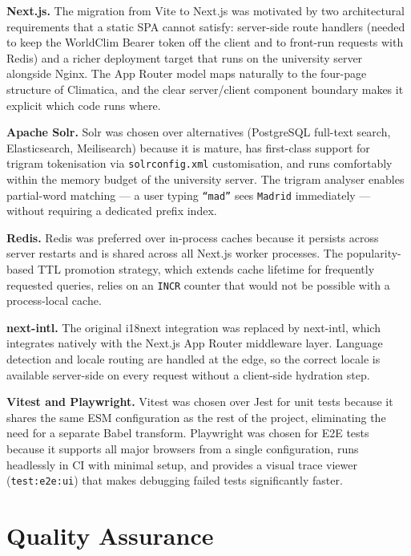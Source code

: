 \textbf{Next.js.} The migration from Vite to Next.js was motivated by two
architectural requirements that a static SPA cannot satisfy: server-side route
handlers (needed to keep the WorldClim Bearer token off the client and to
front-run requests with Redis) and a richer deployment target that runs on the
university server alongside Nginx. The App Router model maps naturally to the
four-page structure of Climatica, and the clear server/client component boundary
makes it explicit which code runs where.

\textbf{Apache Solr.} Solr was chosen over alternatives (PostgreSQL full-text
search, Elasticsearch, Meilisearch) because it is mature, has first-class
support for trigram tokenisation via \texttt{solrconfig.xml} customisation, and
runs comfortably within the memory budget of the university server. The trigram
analyser enables partial-word matching --- a user typing \texttt{``mad''} sees
\texttt{Madrid} immediately --- without requiring a dedicated prefix index.

\textbf{Redis.} Redis was preferred over in-process caches because it persists
across server restarts and is shared across all Next.js worker processes. The
popularity-based TTL promotion strategy, which extends cache lifetime for
frequently requested queries, relies on an \texttt{INCR} counter that would not
be possible with a process-local cache.

\textbf{next-intl.} The original i18next integration was replaced by next-intl,
which integrates natively with the Next.js App Router middleware layer. Language
detection and locale routing are handled at the edge, so the correct locale is
available server-side on every request without a client-side hydration step.

\textbf{Vitest and Playwright.} Vitest was chosen over Jest for unit tests
because it shares the same ESM configuration as the rest of the project,
eliminating the need for a separate Babel transform. Playwright was chosen for
E2E tests because it supports all major browsers from a single configuration,
runs headlessly in CI with minimal setup, and provides a visual trace viewer
(\texttt{test:e2e:ui}) that makes debugging failed tests significantly faster.


\section{Quality Assurance}\label{APP_QA}

